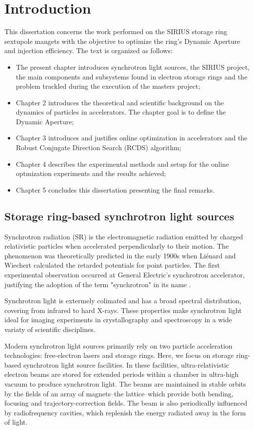 \chapter{Introduction}
This dissertation concerns the work performed on the SIRIUS storage ring sextupole mangets with the objective to optimize the ring's Dynamic Aperture and injection efficiency. The text is organized as follows:
\begin{itemize}
    \item The present chapter introduces synchrotron light sources, the SIRIUS project, the main components and subsystems found in electron storage rings and the problem trackled during the execution of the masters project;
    \item Chapter 2 introduces the theoretical and scientific background on the dynamics of particles in accelerators. The chapter goal is to define the Dynamic Aperture;
    \item Chapter 3 introduces and justifies online optimization in accelerators and the Robust Conjugate Direction Search (RCDS) algorithm;
    \item Chapter 4 describes the experimental methods and setup for the online optmization experiments and the results achieved;
    \item Chapter 5 concludes this dissertation presenting the final remarks.
\end{itemize}

\section{Storage ring-based synchrotron light sources}
Synchrotron radiation (SR) is the electromagnetic radiation emitted by charged relativistic particles when accelerated perpendicularly to their motion. The phenomenon was theoretically predicted in the early 1900s when Liénard and Wiechert calculated the retarded potentials for point particles. The first experimental observation occurred at General Electric's synchrotron accelerator, justifying the adoption of the term "synchrotron" in its name \cite{wiedemann_particle_2015}.

Synchrotron light is extermely colimated and has a broad spectral distribution, covering from infrared to hard X-rays. These properties make synchrotron light ideal for imaging experiments in crystallography and spectroscopy in a wide variaty of scientific disciplines.

Modern synchrotron light sources primarily rely on two particle acceleration technologies: free-electron lasers and storage rings. Here, we focus on storage ring-based synchrotron light source facilities. In these facilities, ultra-relativistic electron beams are stored for extended periods within a chamber in ultra-high vacuum to produce synchrotron light. The beams are maintained in stable orbits by the fields of an array of magnets--the lattice--which provide both bending, focusing and trajectory-correction fields. The beam is also periodically influenced by radiofrequency cavities, which replenish the energy radiated away in the form of light.

